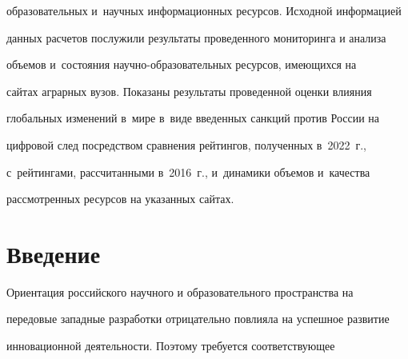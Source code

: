 {образовательных и~научных информационных ресурсов. Исходной информацией 


данных расчетов послужили результаты проведенного мониторинга и анализа 


объемов и~состояния на\-уч\-но-об\-ра\-зо\-ва\-тель\-ных ресурсов, имеющихся на 


сайтах аграрных вузов. Показаны результаты проведенной оценки влияния 


глобальных изменений в~мире в~виде введенных санкций против России на 


цифровой след посредством сравнения рейтингов, полученных в~2022~г., 


с~рейтингами, рассчитанными в~2016~г., и~динамики объемов и~качества 


рассмотренных ресурсов на указанных сайтах.}























 \thispagestyle{headings}


 







\section{Введение}










  Ориентация российского научного и образовательного пространства на 


передовые западные разработки отрицательно повлияла на успешное развитие 


инновационной деятельности. Поэтому требуется соответствующее 


